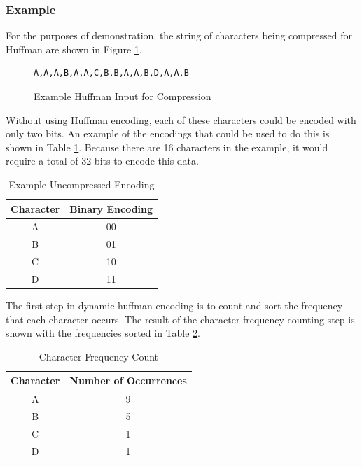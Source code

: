 \documentclass[doublespace,nopageskip]{VTthesis}
\begin{document}
\subsubsection{Example}\label{sss:huffman_example}
For the purposes of demonstration, the string of characters being compressed for Huffman are shown in Figure \ref{fig:examplehuffmanstring}.

\begin{figure}[htb]
	\centering
    \begin{lstlisting}
A,A,A,B,A,A,C,B,B,A,A,B,D,A,A,B
    \end{lstlisting}
	\caption{Example Huffman Input for Compression}
	\label{fig:examplehuffmanstring}
\end{figure}

Without using Huffman encoding, each of these characters could be encoded with only two bits. An example of the encodings that could be used to do this is shown in Table \ref{tab:default_encoding}. Because there are 16 characters in the example, it would require a total of 32 bits to encode this data.

\begin{table}[htb]
	\centering
	\caption{Example Uncompressed Encoding}
	\begin{tabular}{cc}
	    \toprule
	    Character & Binary Encoding\\
	    \midrule
	    A & 00 \\
	    \midrule
	    B & 01 \\
	    \midrule
	    C & 10 \\
	    \midrule
	    D & 11 \\
	    \bottomrule
	\end{tabular}
	\label{tab:default_encoding}
\end{table}

The first step in dynamic huffman encoding is to count and sort the frequency that each character occurs. The result of the character frequency counting step is shown with the frequencies sorted in Table \ref{tab:character_frequency_count}.

\begin{table}[htb]
	\centering
	\caption{Character Frequency Count}
	\begin{tabular}{cc}
	    \toprule
	    Character & Number of Occurrences\\
	    \midrule
	    A & 9 \\
	    \midrule
	    B & 5 \\
	    \midrule
	    C & 1 \\
	    \midrule
	    D & 1 \\
	    \bottomrule
	\end{tabular}
	\label{tab:character_frequency_count}
\end{table}
\end{document}

